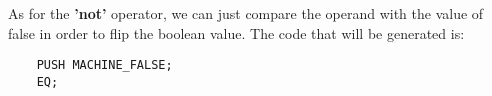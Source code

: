 \documentclass{article}
\begin{document}
As for the \textbf{'not'} operator, we can just compare the operand with the value of false in order to flip the boolean value. The code that will be generated is:

\begin{lstlisting}
    PUSH MACHINE_FALSE;
    EQ;
\end{lstlisting}
\end{document}
